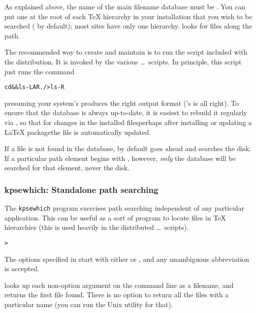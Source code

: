 \documentclass{article}
\begin{document}
As explained above, the name of the main filename database must be
.  You can put one at the root of each \TeX{} hierarchy in
your installation that you wish to be searched ( by
default); most sites have only one hierarchy.  \KPS{} looks for
 files along the  path.

The recommended way to create and maintain  is to run the
 script included with the distribution. It is invoked
by the various \dots\ scripts.  In principle, this script
just runs the command
\begin{alltt}
cd  && ls -LAR ./ >ls-R
\end{alltt}
presuming your system's  produces the right output format
('s  is all right).  To ensure that the database is always
up-to-date, it is easiest to rebuild it regularly via , so
that for changes in the installed files\Dash perhaps after installing or
updating a \LaTeX{} package\Dash the file  is automatically
updated.

If a file is not found in the database, by default \KPS{} goes ahead
and searches the disk. If a particular path element begins with
\samp{!!}, however, \emph{only} the database will be searched for that
element, never the disk.


\subsubsection{kpsewhich: Standalone path searching}
\label{Invoking-kpsewhich}

The \texttt{kpsewhich} program exercises path searching independent of any
particular application.  This can be useful as a sort of 
program to locate files in \TeX{} hierarchies (this is used heavily in
the distributed \dots\ scripts).

\begin{alltt}
> 
\end{alltt}
The options specified in  start with either \samp{-}
or \samp{-{}-}, and any unambiguous abbreviation is accepted.

\KPS{} looks up each non-option argument on the command line as a
filename, and returns the first file found. There is no option to
return all the files with a particular name (you can run the Unix
 utility for that).
\end{document}

